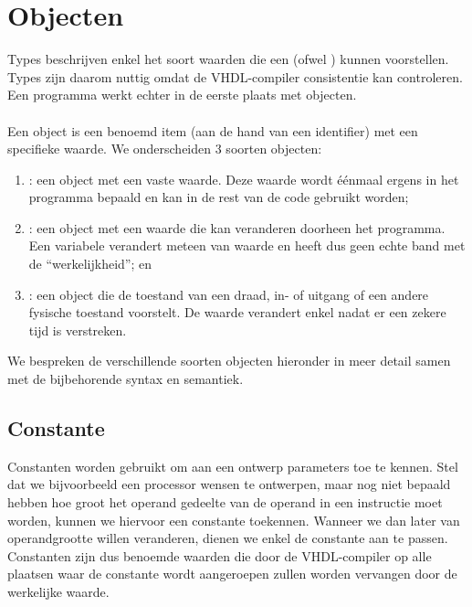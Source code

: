 
\section{Objecten}
Types beschrijven enkel het soort waarden die een  (ofwel ) kunnen voorstellen. Types zijn daarom nuttig omdat de VHDL-compiler consistentie kan controleren. Een programma werkt echter in de eerste plaats met objecten.
\paragraph{}
Een object is een benoemd item (aan de hand van een identifier) met een specifieke waarde. We onderscheiden 3 soorten objecten:
\begin{enumerate}
 \item {}: een object met een vaste waarde. Deze waarde wordt \'e\'enmaal ergens in het programma bepaald en kan in de rest van de code gebruikt worden;
 \item {}: een object met een waarde die kan veranderen doorheen het programma. Een variabele verandert meteen van waarde en heeft dus geen echte band met de ``werkelijkheid''; en
 \item {}: een object die de toestand van een draad, in- of uitgang of een andere fysische toestand voorstelt. De waarde verandert enkel nadat er een zekere tijd is verstreken.
\end{enumerate}

We bespreken de verschillende soorten objecten hieronder in meer detail samen met de bijbehorende syntax en semantiek.

\subsection{Constante}
Constanten worden gebruikt om aan een ontwerp parameters toe te kennen. Stel dat we bijvoorbeeld een processor wensen te ontwerpen, maar nog niet bepaald hebben hoe groot het operand gedeelte van de operand in een instructie moet worden, kunnen we hiervoor een constante toekennen. Wanneer we dan later van operandgrootte willen veranderen, dienen we enkel de constante aan te passen. Constanten zijn dus benoemde waarden die door de VHDL-compiler op alle plaatsen waar de constante wordt aangeroepen zullen worden vervangen door de werkelijke waarde.

